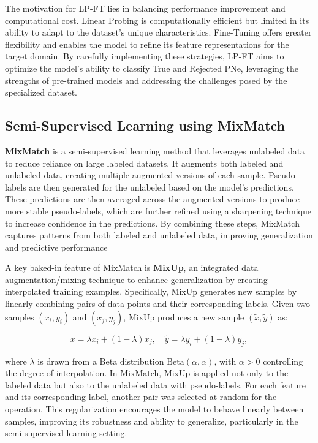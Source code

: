 \documentclass{article}
\begin{document}
The motivation for LP-FT lies in balancing performance improvement and computational cost. Linear Probing is computationally efficient but limited in its ability to adapt to the dataset's unique characteristics. Fine-Tuning offers greater flexibility and enables the model to refine its feature representations for the target domain. By carefully implementing these strategies, LP-FT aims to optimize the model’s ability to classify True and Rejected PNe, leveraging the strengths of pre-trained models and addressing the challenges posed by the specialized dataset.

\subsection{Semi-Supervised Learning using MixMatch}

\textbf{MixMatch} is a semi-supervised learning method that leverages unlabeled data to reduce reliance on large labeled datasets. It augments both labeled and unlabeled data, creating multiple augmented versions of each sample. Pseudo-labels are then generated for the unlabeled based on the model's predictions. These predictions are then averaged across the augmented versions to produce more stable pseudo-labels, which are further refined using a sharpening technique to increase confidence in the predictions. By combining these steps, MixMatch captures patterns from both labeled and unlabeled data, improving generalization and predictive performance

A key baked-in feature of MixMatch is \textbf{MixUp}, an integrated data augmentation/mixing technique to enhance generalization by creating interpolated training examples. Specifically, MixUp generates new samples by linearly combining pairs of data points and their corresponding labels. Given two samples \((x_i, y_i)\) and \((x_j, y_j)\), MixUp produces a new sample \((\tilde{x}, \tilde{y})\) as:

\[
\tilde{x} = \lambda x_i + (1 - \lambda) x_j, \quad \tilde{y} = \lambda y_i + (1 - \lambda) y_j,
\]

where \(\lambda\) is drawn from a Beta distribution \(\text{Beta}(\alpha, \alpha)\), with \(\alpha > 0\) controlling the degree of interpolation.
In MixMatch, MixUp is applied not only to the labeled data but also to the unlabeled data with pseudo-labels.
For each feature and its corresponding label, another pair was selected at random for the operation.
This regularization encourages the model to behave linearly between samples, improving its robustness and ability to generalize, particularly in the semi-supervised learning setting.
\end{document}
